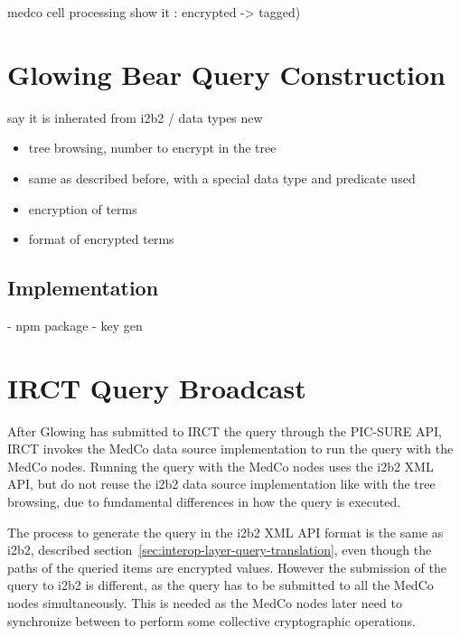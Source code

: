 medco cell processing show it : encrypted -> tagged)

\section{Glowing Bear Query Construction}
say it is inherated from i2b2 / 
data types new



\begin{itemize}
    \item tree browsing, number to encrypt in the tree
    \item same as described before, with a special data type and predicate used
    \item encryption of terms 
    \item format of encrypted terms
\end{itemize}


\subsection*{Implementation}

- npm package
- key gen


\section{IRCT Query Broadcast}

After Glowing has submitted to IRCT the query through the PIC-SURE API, IRCT invokes the MedCo data source implementation to run the query with the MedCo nodes.
Running the query with the MedCo nodes uses the i2b2 XML API, but do not reuse the i2b2 data source implementation like with the tree browsing, due to fundamental differences in how the query is executed.

The process to generate the query in the i2b2 XML API format is the same as i2b2, described section~\ref{sec:interop-layer-query-translation}, even though the paths of the queried items are encrypted values.
However the submission of the query to i2b2 is different, as the query has to be submitted to all the MedCo nodes simultaneously.
This is needed as the MedCo nodes later need to synchronize between to perform some collective cryptographic operations.


